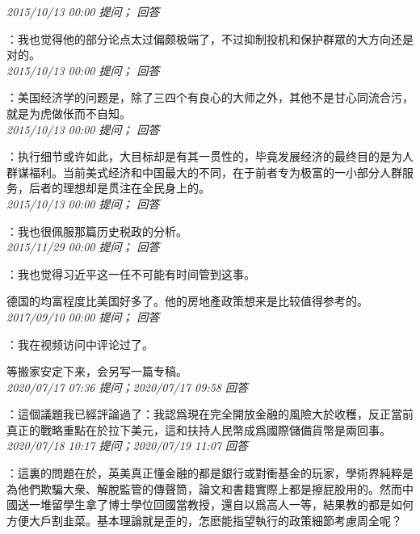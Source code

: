 \documentclass[twocolumn]{ctexart}
\begin{document}
\textit{\hfill\noindent\small 2015/10/13 00:00 提问； 回答}

：我也觉得他的部分论点太过偏颇极端了，不过抑制投机和保护群眾的大方向还是对的。\\

\textit{\hfill\noindent\small 2015/10/13 00:00 提问； 回答}

：美国经济学的问题是，除了三四个有良心的大师之外，其他不是甘心同流合污，就是为虎做伥而不自知。\\

\textit{\hfill\noindent\small 2015/10/13 00:00 提问； 回答}

：执行细节或许如此，大目标却是有其一贯性的，毕竟发展经济的最终目的是为人群谋福利。当前美式经济和中国最大的不同，在于前者专为极富的一小部分人群服务，后者的理想却是贯注在全​​民身上的。\\

\textit{\hfill\noindent\small 2015/10/13 00:00 提问； 回答}

：我也很佩服那篇历史税政的分析。\\

\textit{\hfill\noindent\small 2015/11/29 00:00 提问； 回答}

：我也觉得习近平这一任不可能有时间管到这事。

德国的均富程度比美国好多了。他的房地產政策想来是比较值得参考的。\\

\textit{\hfill\noindent\small 2017/09/10 00:00 提问； 回答}

：我在视频访问中评论过了。

等搬家安定下来，会另写一篇专稿。\\

\textit{\hfill\noindent\small 2020/07/17 07:36 提问；2020/07/17 09:58 回答}

：這個議題我已經評論過了：我認爲現在完全開放金融的風險大於收穫，反正當前真正的戰略重點在於拉下美元，這和扶持人民幣成爲國際儲備貨幣是兩回事。
\\

\textit{\hfill\noindent\small 2020/07/18 10:17 提问；2020/07/19 11:07 回答}

：這裏的問題在於，英美真正懂金融的都是銀行或對衝基金的玩家，學術界純粹是為他們欺騙大衆、解脫監管的傳聲筒，論文和書籍實際上都是擦屁股用的。然而中國送一堆留學生拿了博士學位回國當教授，還自以爲高人一等，結果教的都是如何方便大戶割韭菜。基本理論就是歪的，怎麽能指望執行的政策細節考慮周全呢？
\end{document}
